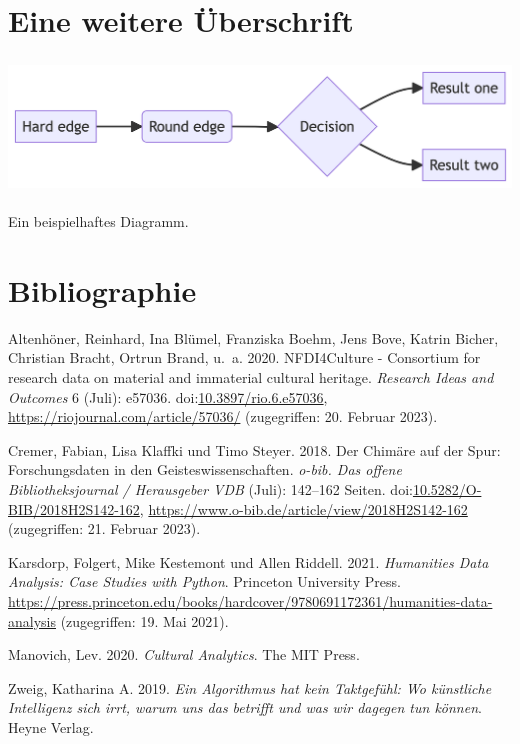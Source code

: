 \documentclass[
  letterpaper,
  DIV=11]{scrartcl}
\newlength{\cslhangindent}
\newenvironment{CSLReferences}[2] %
 {\begin{list}{}{%
  \setlength{\itemindent}{0pt}
  \setlength{\leftmargin}{0pt}
  \setlength{\parsep}{0pt}
  \ifodd #1
   \setlength{\leftmargin}{\cslhangindent}
   \setlength{\itemindent}{-1\cslhangindent}
  \fi
  \setlength{\itemsep}{#2\baselineskip}}}
 {\end{list}}
\begin{document}
\section{Eine weitere Überschrift}\label{eine-weitere-uxfcberschrift}

\includegraphics[width=5.74in,height=1.4in]{index_files/figure-latex/mermaid-figure-1.png}

Ein beispielhaftes Diagramm.

\section{Bibliographie}\label{bibliographie}

\label{refs}
\begin{CSLReferences}{1}{0}
Altenhöner, Reinhard, Ina Blümel, Franziska Boehm, Jens Bove, Katrin
Bicher, Christian Bracht, Ortrun Brand, u.~a. 2020. {NFDI4Culture} -
{Consortium} for research data on material and immaterial cultural
heritage. \emph{Research Ideas and Outcomes} 6 (Juli): e57036.
doi:\href{https://doi.org/10.3897/rio.6.e57036}{10.3897/rio.6.e57036},
\url{https://riojournal.com/article/57036/} (zugegriffen: 20. Februar
2023).

Cremer, Fabian, Lisa Klaffki und Timo Steyer. 2018. Der {Chimäre} auf
der {Spur}: {Forschungsdaten} in den {Geisteswissenschaften}.
\emph{o-bib. Das offene Bibliotheksjournal / Herausgeber VDB} (Juli):
142--162 Seiten.
doi:\href{https://doi.org/10.5282/O-BIB/2018H2S142-162}{10.5282/O-BIB/2018H2S142-162},
\url{https://www.o-bib.de/article/view/2018H2S142-162} (zugegriffen: 21.
Februar 2023).

Karsdorp, Folgert, Mike Kestemont und Allen Riddell. 2021.
\emph{Humanities {Data} {Analysis}: {Case} {Studies} with {Python}}.
Princeton University Press.
\url{https://press.princeton.edu/books/hardcover/9780691172361/humanities-data-analysis}
(zugegriffen: 19. Mai 2021).

Manovich, Lev. 2020. \emph{Cultural {Analytics}}. The MIT Press.

Zweig, Katharina A. 2019. \emph{Ein {Algorithmus} hat kein {Taktgefühl}:
{Wo} künstliche {Intelligenz} sich irrt, warum uns das betrifft und was
wir dagegen tun können}. Heyne Verlag.

\end{CSLReferences}
\end{document}
